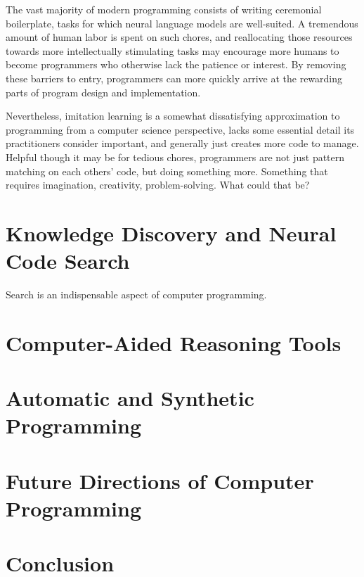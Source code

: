 \documentclass[10pt]{article}
\begin{document}
The vast majority of modern programming consists of writing ceremonial boilerplate, tasks for which neural language models are well-suited. A tremendous amount of human labor is spent on such chores, and reallocating those resources towards more intellectually stimulating tasks may encourage more humans to become programmers who otherwise lack the patience or interest. By removing these barriers to entry, programmers can more quickly arrive at the rewarding parts of program design and implementation.

Nevertheless, imitation learning is a somewhat dissatisfying approximation to programming from a computer science perspective, lacks some essential detail its practitioners consider important, and generally just creates more code to manage. Helpful though it may be for tedious chores, programmers are not just pattern matching on each others' code, but doing something more. Something that requires imagination, creativity, problem-solving. What could that be?

  \section{Knowledge Discovery and Neural Code Search}

  Search is an indispensable aspect of computer programming.

  \section{Computer-Aided Reasoning Tools}

  \section{Automatic and Synthetic Programming}

  \section{Future Directions of Computer Programming}

  \section{Conclusion}

  
  
\end{document}
